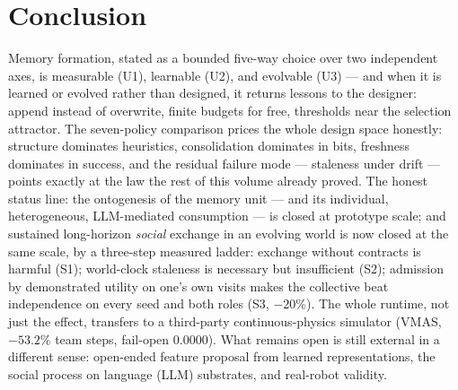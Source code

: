 \documentclass{article}
\begin{document}
\section{Conclusion}

Memory formation, stated as a bounded five-way choice over two
independent axes, is measurable (U1), learnable (U2), and evolvable
(U3) --- and when it is learned or evolved rather than designed, it
returns lessons to the designer: append instead of overwrite, finite
budgets for free, thresholds near the selection attractor. The
seven-policy comparison prices the whole design space honestly:
structure dominates heuristics, consolidation dominates in bits,
freshness dominates in success, and the residual failure mode ---
staleness under drift --- points exactly at the law the rest of this
volume already proved. The honest status line: the ontogenesis of the
memory unit --- and its individual, heterogeneous, LLM-mediated
consumption --- is closed at prototype scale; and sustained long-horizon
\emph{social} exchange in an evolving world is now closed at the same
scale, by a three-step measured ladder: exchange without contracts is
harmful (S1); world-clock staleness is necessary but insufficient
(S2); admission by demonstrated utility on one's own visits makes the
collective beat independence on every seed and both roles (S3,
$-20\%$). The whole runtime, not just the effect, transfers to a
third-party continuous-physics simulator (VMAS, $-53.2\%$ team steps,
fail-open $0.0000$). What remains open is still external in a
different sense: open-ended feature proposal from learned
representations, the social process on language (LLM) substrates, and
real-robot validity.
\end{document}
